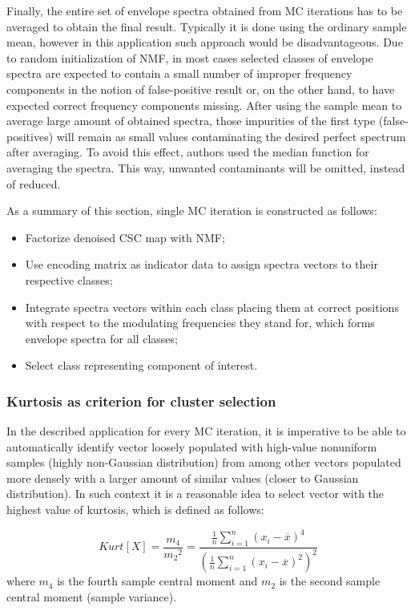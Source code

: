 \documentclass[3p, 12pt]{elsarticle} %
\begin{document}
Finally, the entire set of envelope spectra obtained from MC iterations has to be averaged to obtain the final result. Typically it is done using the ordinary sample mean, however in this application such approach would be disadvantageous. Due to random initialization of NMF, in most cases selected classes of envelope spectra are expected to contain a small number of improper frequency components in the notion of false-positive result or, on the other hand, to have expected correct frequency components missing. After using the sample mean to average large amount of obtained spectra, those impurities of the first type (false-positives) will remain as small values contaminating the desired perfect spectrum after averaging. To avoid this effect, authors used the median function for averaging the spectra. This way, unwanted contaminants will be omitted, instead of reduced.

As a summary of this section, single MC iteration is constructed as follows:

\begin{itemize}
    \item Factorize denoised CSC map with NMF;
    \item Use encoding matrix as indicator data to assign spectra vectors to their respective classes;
    \item Integrate spectra vectors within each class placing them at correct positions with respect to the modulating frequencies they stand for, which forms envelope spectra for all classes;
    \item Select class representing component of interest.
\end{itemize}

\subsubsection{Kurtosis as criterion for cluster selection}\label{kurt}

In the described application for every MC iteration, it is imperative to be able to automatically identify vector loosely populated with high-value nonuniform samples (highly non-Gaussian distribution) from among other vectors populated more densely with a larger amount of similar values (closer to Gaussian distribution). In such context it is a reasonable idea to select vector with the highest value of kurtosis, which is defined as follows:

\begin{equation}
\label{eq:kurtosis}
Kurt[X]=\frac{m_4}{{m_2}^2}=\frac{\frac{1}{n} \sum_{i=1}^{n} \left(x_i - \overline{x} \right)^4}{\left({\frac{1}{n} \sum_{i=1}^{n} \left(x_i - \overline{x} \right)^2}\right)^2}
\end{equation}
where $m_4$ is the fourth sample central moment and $m_2$ is the second sample central moment (sample variance).
\end{document}
